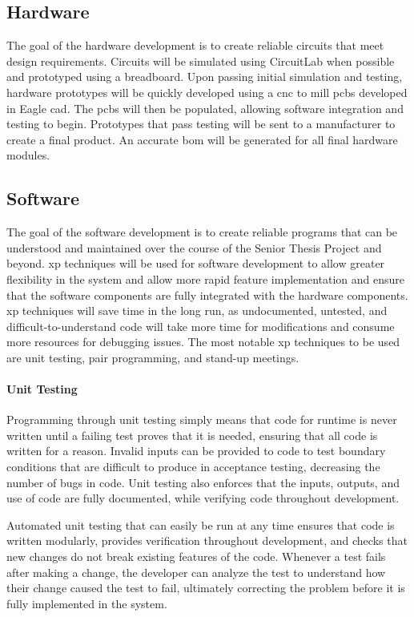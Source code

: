 \subsection{Hardware}
The goal of the hardware development is to create reliable circuits that meet design requirements.
Circuits will be simulated using CircuitLab when possible and prototyped using a breadboard.
Upon passing initial simulation and testing, hardware prototypes will be quickly developed using a \gls{cnc} to mill \gls{pcb}s developed in Eagle \gls{cad}.
The \gls{pcb}s will then be populated, allowing software integration and testing to begin.
Prototypes that pass testing will be sent to a manufacturer to create a final product.
An accurate \gls{bom} will be generated for all final hardware modules.

\subsection{Software}
The goal of the software development is to create reliable programs that can be understood and maintained over the course of the Senior Thesis Project and beyond.
\gls{xp} techniques will be used for software development to allow greater flexibility in the system and allow more rapid feature implementation and ensure that the software components are fully integrated with the hardware components. 
\gls{xp} techniques will save time in the long run, as undocumented, untested, and difficult-to-understand code will take more time for modifications and consume more resources for debugging issues.
The most notable \gls{xp} techniques to be used are unit testing, pair programming, and stand-up meetings.

\paragraph{Unit Testing}
Programming through unit testing simply means that code for runtime is never written until a failing test proves that it is needed, ensuring that all code is written for a reason.
Invalid inputs can be provided to code to test boundary conditions that are difficult to produce in acceptance testing, decreasing the number of bugs in code.
Unit testing also enforces that the inputs, outputs, and use of code are fully documented, while verifying code throughout development. 

Automated unit testing that can easily be run at any time ensures that code is written modularly, provides verification throughout development, and checks that new changes do not break existing features of the code.
Whenever a test fails after making a change, the developer can analyze the test to understand how their change caused the test to fail, ultimately correcting the problem before it is fully implemented in the system.
 
